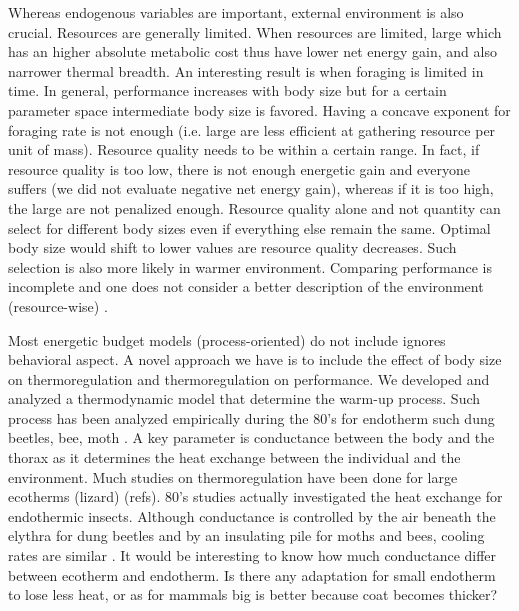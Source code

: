 {Whereas endogenous variables are important, external environment is also crucial.
Resources are generally limited.
When resources are limited, large which has an higher absolute metabolic cost thus have lower net energy gain, and also narrower thermal breadth.
An interesting result is when foraging is limited in time.
In general, performance increases with body size but for a certain parameter space intermediate body size is favored.
Having a concave exponent for foraging rate is not enough (i.e. large are less efficient at gathering resource per unit of mass).
Resource quality needs to be within a certain range.
In fact, if resource quality is too low, there is not enough energetic gain and everyone suffers (we did not evaluate negative net energy gain), whereas if it is too high, the large are not penalized enough.
Resource quality alone and not quantity can select for different body sizes even if everything else remain the same.
Optimal body size would shift to lower values are resource quality decreases.
Such selection is also more likely in warmer environment.
Comparing performance is incomplete and one does not consider a better description of the environment (resource-wise) \citet{Sears2015}.

Most energetic budget models (process-oriented) do not include ignores behavioral aspect.
A novel approach we have is to include the effect of body size on thermoregulation and thermoregulation on performance.
We developed and analyzed a thermodynamic model that determine the warm-up process.
Such process has been analyzed empirically during the 80's  for endotherm  such dung beetles, bee, moth \citep{Heinrich1975, Bartholomew1978, Bartholomew1981}.
A key parameter is conductance between the body and the thorax as it determines the heat exchange between the individual and the environment.
Much studies on thermoregulation have been done for large ecotherms (lizard) (refs).
80's studies actually investigated the heat exchange for endothermic insects.
Although conductance is controlled by the air beneath the elythra for dung beetles and by an insulating pile for moths and bees, cooling rates are similar \citep{Bartholomew1978}.  
It would be interesting to know  how much conductance differ between ecotherm and endotherm.
Is there any adaptation for small endotherm to lose less heat, or as for mammals big is better because coat becomes thicker?

}
